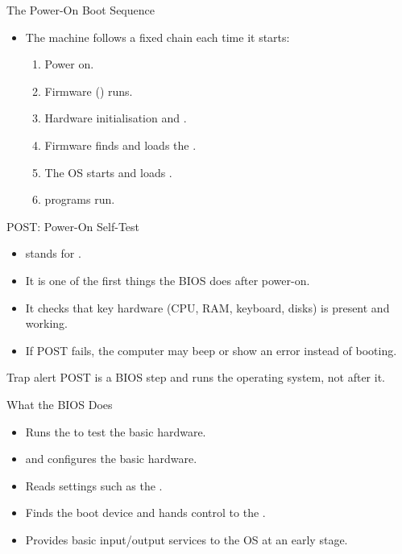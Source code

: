 \documentclass[aspectratio=169]{beamer}
\begin{document}
\begin{frame}{The Power-On Boot Sequence}
  \begin{itemize}
    \item The machine follows a fixed chain each time it starts:
      \begin{enumerate}
        \item Power on.
        \item Firmware () runs.
        \item Hardware initialisation and .
        \item Firmware finds and loads the .
        \item The OS starts and loads .
        \item {} programs run.
      \end{enumerate}
  \end{itemize}
  \vspace{0.2cm}
\end{frame}

\begin{frame}{POST: Power-On Self-Test}
  \begin{itemize}
    \item {} stands for .
    \item It is one of the first things the BIOS does after power-on.
    \item It checks that key hardware (CPU, RAM, keyboard, disks) is present
      and working.
    \item If POST fails, the computer may beep or show an error instead of
      booting.
  \end{itemize}
  \begin{alertblock}{Trap alert}
    POST is a BIOS step and runs  the operating system, not
    after it.
  \end{alertblock}
\end{frame}

\begin{frame}{What the BIOS Does}
  \begin{itemize}
    \item Runs the  to test the basic hardware.
    \item {} and configures the basic hardware.
    \item Reads settings such as the .
    \item Finds the boot device and hands control to the .
    \item Provides basic input/output services to the OS at an early stage.
  \end{itemize}
\end{frame}
\end{document}
